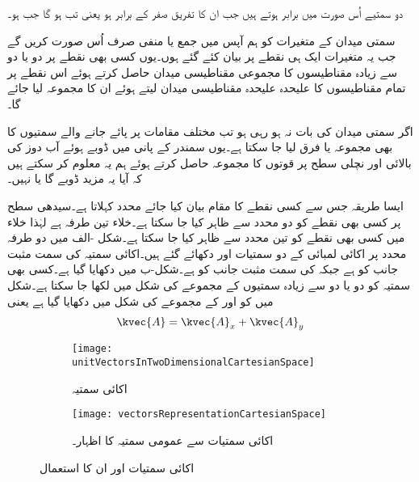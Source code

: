 دو سمتیے اُس صورت میں برابر ہوتے ہیں جب ان کا تفریق صفر کے برابر ہو یعنی  تب ہو گا جب  ہو۔

سمتی میدان کے متغیرات کو ہم آپس میں جمع یا منفی صرف اُس صورت کریں گے جب یہ متغیرات ایک ہی نقطے پر بیان کئے گئے ہوں۔یوں کسی بھی نقطے پر دو یا دو سے زیادہ مقناطیسوں کا مجموعی مقناطیسی میدان حاصل کرتے ہوئے اس نقطے پر تمام مقناطیسوں کا علیحدہ علیحدہ مقناطیسی میدان لیتے ہوئے ان کا مجموعہ لیا جائے گا۔

اگر سمتی میدان کی بات نہ ہو رہی ہو تب مختلف مقامات پر پائے جانے والے سمتیوں کا بھی مجموعہ یا فرق لیا جا سکتا ہے۔یوں سمندر کے پانی میں ڈوبے ہوئے آب دوز کی بالائی اور نچلی سطح پر قوتوں کا مجموعہ حاصل کرتے ہوئے ہم یہ معلوم کر سکتے ہیں کہ آیا یہ مزید ڈوبے گا یا نہیں۔  

ایسا طریقہ جس سے کسی نقطے کا مقام بیان کیا جائے محدد کہلاتا ہے۔سیدھی سطح پر کسی بھی نقطے کو دو محدد سے ظاہر کیا جا سکتا ہے۔خلاء تین طرفہ ہے لہٰذا خلاء میں کسی بھی نقطے کو تین محدد سے ظاہر کیا جا سکتا ہے۔شکل -الف میں دو طرفہ   محدد پر اکائی لمبائی کے دو سمتیات  اور  دکھائے گئے ہیں۔اکائی سمتیہ  کی سمت مثبت  جانب کو ہے جبکہ   کی سمت مثبت  جانب کو ہے۔شکل-ب میں  دکھایا گیا ہے۔کسی بھی سمتیہ کو دو یا دو سے زیادہ سمتیوں کے مجموعے کی شکل میں لکھا جا سکتا ہے۔شکل میں  کو  اور  کے مجموعے کی شکل میں دکھایا گیا ہے یعنی
\begin{align}
\kvec{A}=\kvec{A}_x+\kvec{A}_y
\end{align}

\begin{figure}
\centering
\begin{subfigure}{0.5\textwidth}
\centering
\texttt{[image: unitVectorsInTwoDimensionalCartesianSpace]}
\caption{اکائی سمتیہ}
\end{subfigure}%
%
\begin{subfigure}{0.5\textwidth}
\centering
\texttt{[image: vectorsRepresentationCartesianSpace]}
\caption{اکائی سمتیات سے عمومی سمتیہ کا اظہار۔}
\end{subfigure}%
\caption{اکائی سمتیات اور ان کا استعمال}
\label{شکل_سمتیہ_اکائی_سے_سمتیہ_کا_اظہار}
\end{figure}
%


